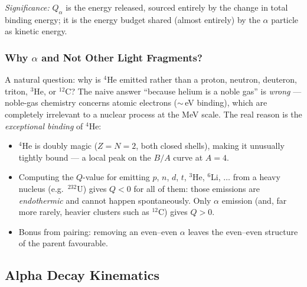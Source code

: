 \textit{Significance:} $Q_\alpha$ is the energy released, sourced entirely by the
change in total binding energy; it is the energy budget shared (almost entirely)
by the $\alpha$ particle as kinetic energy.

\subsubsection*{Why $\alpha$ and Not Other Light Fragments?}
A natural question: why is $^4$He emitted rather than a proton, neutron,
deuteron, triton, $^3$He, or $^{12}$C?  The naive answer ``because helium is a
noble gas'' is \emph{wrong} --- noble-gas chemistry concerns atomic electrons
($\sim$\,eV binding), which are completely irrelevant to a nuclear process at the
MeV scale.  The real reason is the \emph{exceptional binding} of $^4$He:
\begin{itemize}
  \item $^4$He is doubly magic ($Z=N=2$, both closed shells), making it
        unusually tightly bound --- a local peak on the $B/A$ curve at $A=4$.
  \item Computing the $Q$-value for emitting $p$, $n$, $d$, $t$, $^3$He, $^6$Li,
        $\ldots$ from a heavy nucleus (e.g.\ $^{232}$U) gives $Q<0$ for all of
        them: those emissions are \emph{endothermic} and cannot happen
        spontaneously.  Only $\alpha$ emission (and, far more rarely, heavier
        clusters such as $^{12}$C) gives $Q>0$.
  \item Bonus from pairing: removing an even--even $\alpha$ leaves the
        even--even structure of the parent favourable.
\end{itemize}

\subsection{Alpha Decay Kinematics}
\label{subsec:lec08:kinematics}

